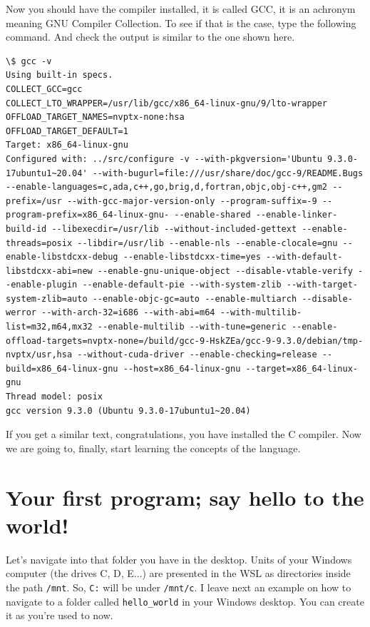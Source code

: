 \documentclass[a4paper]{article}
\begin{document}
Now you should have the compiler installed, it is called GCC, it is an achronym
meaning GNU Compiler Collection. To see if that is the case, type the following
command. And check the output is similar to the one shown here.

\noindent
\begin{minipage}[H]{\linewidth}
\mbox{}
\begin{lstlisting}[style=terminalStyle]
\$ gcc -v
Using built-in specs.
COLLECT_GCC=gcc
COLLECT_LTO_WRAPPER=/usr/lib/gcc/x86_64-linux-gnu/9/lto-wrapper
OFFLOAD_TARGET_NAMES=nvptx-none:hsa
OFFLOAD_TARGET_DEFAULT=1
Target: x86_64-linux-gnu
Configured with: ../src/configure -v --with-pkgversion='Ubuntu 9.3.0-17ubuntu1~20.04' --with-bugurl=file:///usr/share/doc/gcc-9/README.Bugs --enable-languages=c,ada,c++,go,brig,d,fortran,objc,obj-c++,gm2 --prefix=/usr --with-gcc-major-version-only --program-suffix=-9 --program-prefix=x86_64-linux-gnu- --enable-shared --enable-linker-build-id --libexecdir=/usr/lib --without-included-gettext --enable-threads=posix --libdir=/usr/lib --enable-nls --enable-clocale=gnu --enable-libstdcxx-debug --enable-libstdcxx-time=yes --with-default-libstdcxx-abi=new --enable-gnu-unique-object --disable-vtable-verify --enable-plugin --enable-default-pie --with-system-zlib --with-target-system-zlib=auto --enable-objc-gc=auto --enable-multiarch --disable-werror --with-arch-32=i686 --with-abi=m64 --with-multilib-list=m32,m64,mx32 --enable-multilib --with-tune=generic --enable-offload-targets=nvptx-none=/build/gcc-9-HskZEa/gcc-9-9.3.0/debian/tmp-nvptx/usr,hsa --without-cuda-driver --enable-checking=release --build=x86_64-linux-gnu --host=x86_64-linux-gnu --target=x86_64-linux-gnu
Thread model: posix
gcc version 9.3.0 (Ubuntu 9.3.0-17ubuntu1~20.04)
\end{lstlisting}
\end{minipage}

If you get a similar text, congratulations, you have installed the C compiler.
Now we are going to, finally, start learning the concepts of the language.

\section{Your first program; say hello to the world!}

Let's navigate into that folder you have in the desktop. Units of your Windows
computer (the drives C, D, E...) are presented in the WSL as directories inside
the path \verb!/mnt!. So, \verb!C:! will be under \verb!/mnt/c!. I leave next an
example on how to navigate to a folder called \verb!hello_world! in your Windows
desktop. You can create it as you're used to now.
\end{document}
